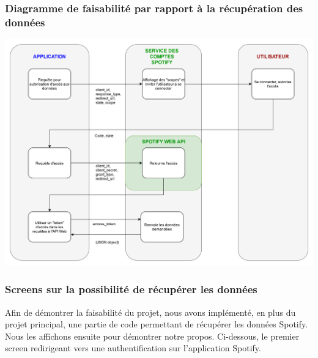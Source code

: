 \documentclass[12pt, openany]{report}
\begin{document}
 \subsubsection{Diagramme de faisabilité par rapport à la récupération des données}
   
   \includegraphics[scale=0.17]{images/schema_faisa_1.png}
   
   \newpage
   
 \subsubsection{Screens sur la possibilité de récupérer les données}
 
    Afin de démontrer la faisabilité du projet, nous avons implémenté, en plus du projet principal, une partie de code permettant de récupérer les données Spotify. Nous les affichons ensuite pour démontrer notre propos. Ci-dessous, le premier screen redirigeant vers une authentification sur l'application Spotify.
    \\
    \\
 
\end{document}
